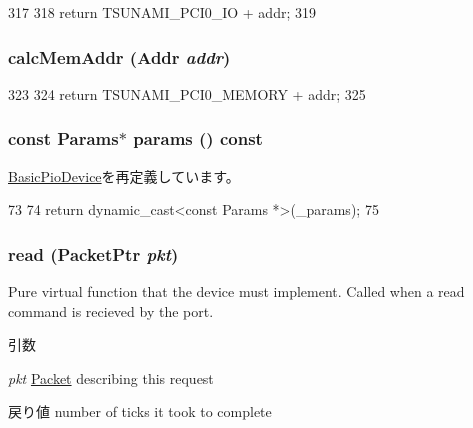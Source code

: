 \begin{DoxyCode}
317 {
318     return TSUNAMI_PCI0_IO + addr;
319 }
\end{DoxyCode}
\hypertarget{classTsunamiPChip_a0501fb8a3bd69d670b9b92d2f7991ad2}{
\subsubsection[{calcMemAddr}]{ calcMemAddr ({\bf Addr} {\em addr})}}
\label{classTsunamiPChip_a0501fb8a3bd69d670b9b92d2f7991ad2}



\begin{DoxyCode}
323 {
324     return TSUNAMI_PCI0_MEMORY + addr;
325 }
\end{DoxyCode}
\hypertarget{classTsunamiPChip_acd3c3feb78ae7a8f88fe0f110a718dff}{
\subsubsection[{params}]{\setlength{\rightskip}{0pt plus 5cm}const {\bf Params}$\ast$ params () const}}
\label{classTsunamiPChip_acd3c3feb78ae7a8f88fe0f110a718dff}


\hyperlink{classBasicPioDevice_acd3c3feb78ae7a8f88fe0f110a718dff}{BasicPioDevice}を再定義しています。


\begin{DoxyCode}
73     {
74         return dynamic_cast<const Params *>(_params);
75     }
\end{DoxyCode}
\hypertarget{classTsunamiPChip_a613ec7d5e1ec64f8d21fec78ae8e568e}{
\subsubsection[{read}]{ read ({\bf PacketPtr} {\em pkt})}}
\label{classTsunamiPChip_a613ec7d5e1ec64f8d21fec78ae8e568e}
Pure virtual function that the device must implement. Called when a read command is recieved by the port. 
\begin{DoxyParams}{引数}
\item[{\em pkt}]\hyperlink{classPacket}{Packet} describing this request \end{DoxyParams}
\begin{DoxyReturn}{戻り値}
number of ticks it took to complete 
\end{DoxyReturn}


